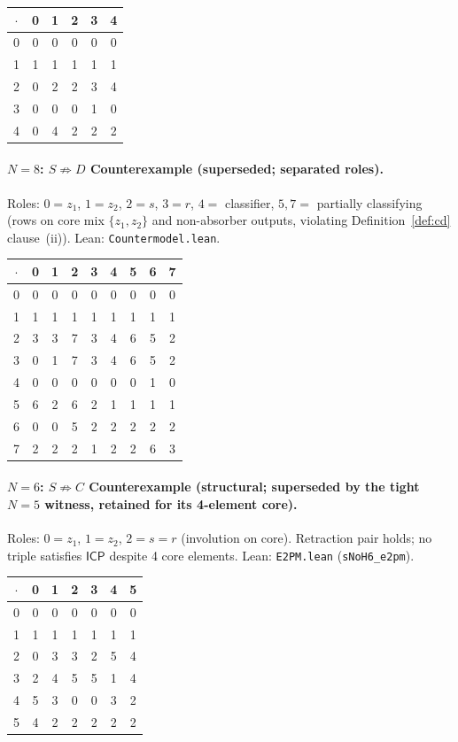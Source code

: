 \documentclass[sigconf,screen]{acmart}
\newcommand{\dotop}{\cdot}
\newcommand{\ICP}{\textsf{ICP}}
\theoremstyle{remark}
\begin{document}
\medskip
{\small
\begin{tabular}{c|ccccc}
$\dotop$ & 0 & 1 & 2 & 3 & 4 \\\hline
0 & 0 & 0 & 0 & 0 & 0 \\
1 & 1 & 1 & 1 & 1 & 1 \\
2 & 0 & 2 & 2 & 3 & 4 \\
3 & 0 & 0 & 0 & 1 & 0 \\
4 & 0 & 4 & 2 & 2 & 2 \\
\end{tabular}}

\paragraph{$N\!=\!8$: $S \not\Rightarrow D$ Counterexample (superseded; separated roles).}
Roles: $0 = z_1$, $1 = z_2$, $2 = s$, $3 = r$, $4 =$ classifier, $5, 7 =$ partially classifying (rows on core mix $\{z_1, z_2\}$ and non-absorber outputs, violating Definition~\ref{def:cd} clause~(ii)). \quad Lean: \texttt{Countermodel.lean}.

\medskip
{\small
\begin{tabular}{c|cccccccc}
$\dotop$ & 0 & 1 & 2 & 3 & 4 & 5 & 6 & 7 \\\hline
0 & 0 & 0 & 0 & 0 & 0 & 0 & 0 & 0 \\
1 & 1 & 1 & 1 & 1 & 1 & 1 & 1 & 1 \\
2 & 3 & 3 & 7 & 3 & 4 & 6 & 5 & 2 \\
3 & 0 & 1 & 7 & 3 & 4 & 6 & 5 & 2 \\
4 & 0 & 0 & 0 & 0 & 0 & 0 & 1 & 0 \\
5 & 6 & 2 & 6 & 2 & 1 & 1 & 1 & 1 \\
6 & 0 & 0 & 5 & 2 & 2 & 2 & 2 & 2 \\
7 & 2 & 2 & 2 & 1 & 2 & 2 & 6 & 3 \\
\end{tabular}}

\paragraph{$N\!=\!6$: $S \not\Rightarrow C$ Counterexample (structural; superseded by the tight $N\!=\!5$ witness, retained for its 4-element core).}
Roles: $0 = z_1$, $1 = z_2$, $2 = s = r$ (involution on core). Retraction pair holds; no triple satisfies $\ICP$ despite 4 core elements. \quad Lean: \texttt{E2PM.lean} (\texttt{sNoH6\_e2pm}).

\medskip
{\small
\begin{tabular}{c|cccccc}
$\dotop$ & 0 & 1 & 2 & 3 & 4 & 5 \\\hline
0 & 0 & 0 & 0 & 0 & 0 & 0 \\
1 & 1 & 1 & 1 & 1 & 1 & 1 \\
2 & 0 & 3 & 3 & 2 & 5 & 4 \\
3 & 2 & 4 & 5 & 5 & 1 & 4 \\
4 & 5 & 3 & 0 & 0 & 3 & 2 \\
5 & 4 & 2 & 2 & 2 & 2 & 2 \\
\end{tabular}}
\end{document}
